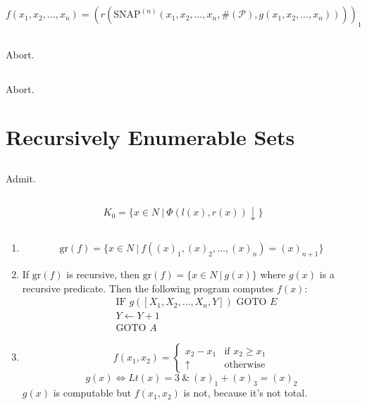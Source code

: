 \subsection{}
\[ f(x_1,x_2,\dots,x_n) =
   (r(\mathrm{SNAP}^{(n)}(x_1,x_2,\dots,x_n,\#(\mathscr{P}),g(x_1,x_2,\dots,x_n))))_1 \]


\subsection{}
Abort.

\subsection{}
Abort.



\section{Recursively Enumerable Sets}

\subsection{}
Admit.


\subsection{}
\[ K_0 = \{ x\in N\ |\ \Phi(l(x), r(x))\downarrow \} \]


\subsection{}
\begin{enumerate}
  \item
  \[ \mathrm{gr}(f) = \{ x\in N \ |\ f((x)_1, (x)_2, \dots, (x)_n) = (x)_{n+1} \} \]

  \item
  If $ \mathrm{gr}(f) $ is recursive, then
  $ \mathrm{gr}(f) = \{ x\in N \ |\ g(x) \} $
  where $ g(x) $ is a recursive predicate.
  Then the following program computes $ f(x) $:
  \begin{align*}
    [A]\ & \text{IF } g([X_1,X_2,\dots,X_n,Y]) \text{ GOTO } E \\
         & Y \gets Y + 1 \\
         & \text{GOTO } A
  \end{align*}

  \item 
  \[ f(x_1,x_2) = 
     \begin{cases}
       x_2 - x_1 & \text{if } x_2 \ge x_1 \\
       \uparrow  & \text{otherwise}
     \end{cases} \]
  \[ g(x) \Leftrightarrow Lt(x) = 3\ \&\ (x)_1 + (x)_3 = (x)_2 \]
  $ g(x) $ is computable but $ f(x_1,x_2) $ is not, because it's not total.
\end{enumerate}


